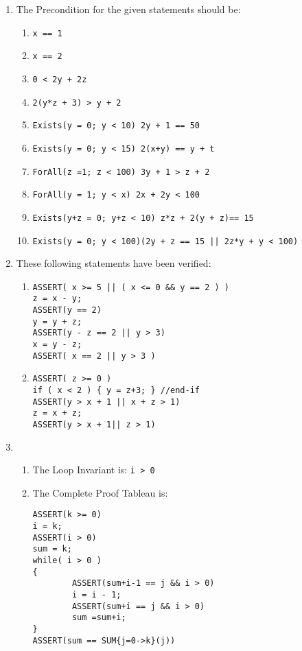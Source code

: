\documentclass[12pt]{book}
\title{\coursetitle\linebreak\lecturename}
\author{\\Cain Susko\\ 
           \\ \\ \\
      Queen's University 
    \\School of Computing\\}
\begin{document}
\begin{titlepage}
        \maketitle
\end{titlepage}


\begin{enumerate}
        \item The Precondition for the given statements should be:
        \begin{enumerate}
                \item \texttt{x == 1}
                \item \texttt{x == 2}
                \item \texttt{0 < 2y + 2z}
                \item \texttt{2(y*z + 3) > y + 2}
                \item \texttt{Exists(y = 0; y < 10) 2y + 1 == 50}
                \item \texttt{Exists(y = 0; y < 15) 2(x+y) == y + t}
                \item \texttt{ForAll(z =1; z < 100) 3y + 1 > z + 2}
                \item \texttt{ForAll(y = 1; y < x) 2x + 2y < 100}
                \item \texttt{Exists(y+z = 0; y+z < 10) z*z + 2(y + z)== 15}
                \item \texttt{Exists(y = 0; y < 100)(2y + z == 15 || 2z*y + y < 100)}
        \end{enumerate}
        \item These following statements have been verified:
        \begin{enumerate}
                \item \begin{verbatim}
ASSERT( x >= 5 || ( x <= 0 && y == 2 ) )
z = x - y;
ASSERT(y == 2)
y = y + z;
ASSERT(y - z == 2 || y > 3)
x = y - z;
ASSERT( x == 2 || y > 3 )
                \end{verbatim}
                \item \begin{verbatim}
ASSERT( z >= 0 )
if ( x < 2 ) { y = z+3; } //end-if 
ASSERT(y > x + 1 || x + z > 1)
z = x + z;
ASSERT(y > x + 1|| z > 1)
                \end{verbatim}
        \end{enumerate}

        \item \begin{enumerate}
                \item The Loop Invariant is:
                        \texttt{i > 0}
\pagebreak
                \item The Complete Proof Tableau is:
                        \begin{verbatim}
ASSERT(k >= 0)
i = k;
ASSERT(i > 0)
sum = k;
while( i > 0 )
{
        ASSERT(sum+i-1 == j && i > 0)
        i = i - 1;
        ASSERT(sum+i == j && i > 0)
        sum =sum+i; 
}
ASSERT(sum == SUM{j=0->k}(j))
                        \end{verbatim}
        \end{enumerate}


\end{enumerate}
\end{document}

